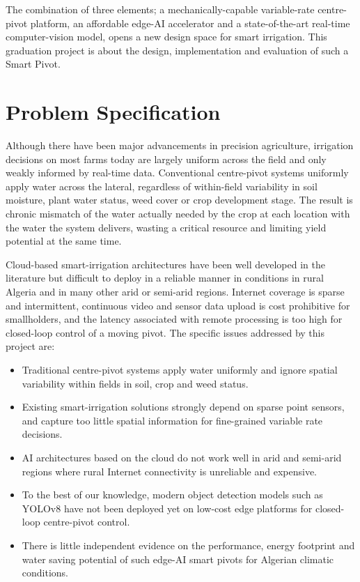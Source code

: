 \documentclass[12pt,a4paper]{report}
\begin{document}
The combination of three elements; a mechanically-capable variable-rate centre-pivot platform, an affordable edge-AI accelerator and a state-of-the-art real-time computer-vision model, opens a new design space for smart irrigation. This graduation project is about the design, implementation and evaluation of such a Smart Pivot.

\section{Problem Specification}

Although there have been major advancements in precision agriculture, irrigation decisions on most farms today are largely uniform across the field and only weakly informed by real-time data. Conventional centre-pivot systems uniformly apply water across the lateral, regardless of within-field variability in soil moisture, plant water status, weed cover or crop development stage. The result is chronic mismatch of the water actually needed by the crop at each location with the water the system delivers, wasting a critical resource and limiting yield potential at the same time.

Cloud-based smart-irrigation architectures have been well developed in the literature but difficult to deploy in a reliable manner in conditions in rural Algeria and in many other arid or semi-arid regions. Internet coverage is sparse and intermittent, continuous video and sensor data upload is cost prohibitive for smallholders, and the latency associated with remote processing is too high for closed-loop control of a moving pivot. The specific issues addressed by this project are:

\begin{itemize}
    \item Traditional centre-pivot systems apply water uniformly and ignore spatial variability within fields in soil, crop and weed status.
    \item Existing smart-irrigation solutions strongly depend on sparse point sensors, and capture too little spatial information for fine-grained variable rate decisions.
    \item AI architectures based on the cloud do not work well in arid and semi-arid regions where rural Internet connectivity is unreliable and expensive.
    \item To the best of our knowledge, modern object detection models such as YOLOv8 have not been deployed yet on low-cost edge platforms for closed-loop centre-pivot control.
    \item There is little independent evidence on the performance, energy footprint and water saving potential of such edge-AI smart pivots for Algerian climatic conditions.
\end{itemize}
\end{document}
